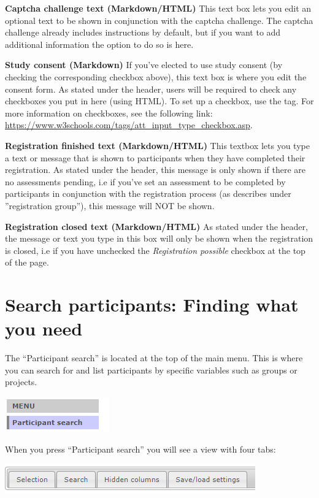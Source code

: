 \documentclass[]{book}
\begin{document}
\textbf{Captcha challenge text (Markdown/HTML)}
This text box lets you edit an optional text to be shown in conjunction with the captcha challenge. The captcha challenge already includes instructions by default, but if you want to add additional information the option to do so is here.

\textbf{Study consent (Markdown)}
If you've elected to use study consent (by checking the corresponding checkbox above), this text box is where you edit the consent form. As stated under the header, users will be required to check any checkboxes you put in here (using HTML). To set up a checkbox, use the tag. For more information on checkboxes, see the following link: \url{https://www.w3schools.com/tags/att_input_type_checkbox.asp}.

\textbf{Registration finished text (Markdown/HTML)}
This textbox lets you type a text or message that is shown to participants when they have completed their registration. As stated under the header, this message is only shown if there are no assessments pending, i.e if you've set an assessment to be completed by participants in conjunction with the registration process (as describes under ''registration group''), this message will NOT be shown.

\textbf{Registration closed text (Markdown/HTML)}
As stated under the header, the message or text you type in this box will only be shown when the registration is closed, i.e if you have unchecked the \emph{Registration possible} checkbox at the top of the page.

\hypertarget{search-participants-finding-what-you-need}{%
\chapter{Search participants: Finding what you need}\label{search-participants-finding-what-you-need}}

The ``Participant search'' is located at the top of the main menu. This is where you can search for and list participants by specific variables such as groups or projects.

\includegraphics{images/search-participants-menu.png}

When you press ``Participant search'' you will see a view with four tabs:

\includegraphics{images/search-participants-tab.png}
\end{document}
